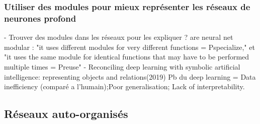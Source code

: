 \subsubsection{Utiliser des modules pour mieux représenter les réseaux de neurones profond}
- Trouver des modules dans les réseaux pour les expliquer ? \cite{Watanabe2018ModularRO,Csordas2021AreNN}
are neural net modular : "it uses different modules for very different functions = Pspecialize," et "it uses the same module for identical functions that
may have to be performed multiple times = Preuse"
- Reconciling deep learning with symbolic artificial intelligence: representing objects and relations(2019)
Pb du deep learning = Data inefficiency (comparé a l'humain);Poor generalisation; Lack of interpretability.

\subsection{Réseaux auto-organisés}

